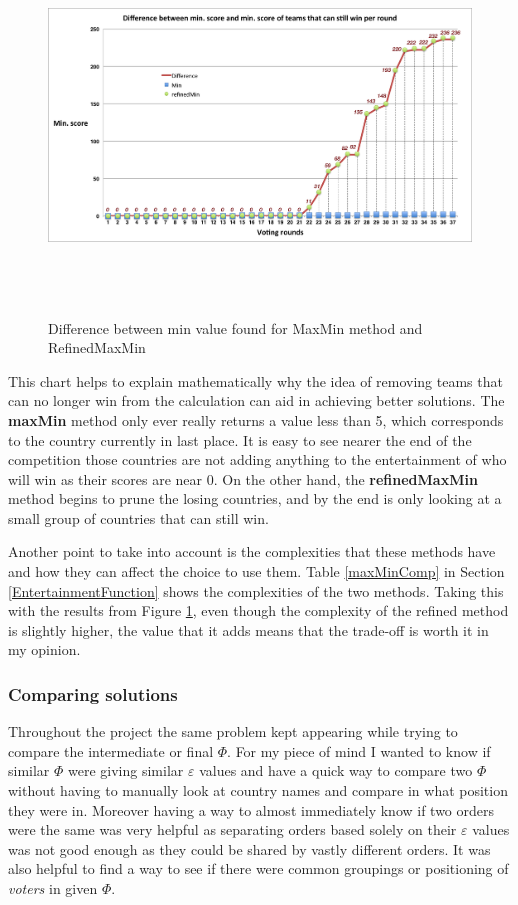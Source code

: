 \documentclass[12pt]{report}
\begin{document}
\begin{figure}[H]
\centering
\includegraphics[width=17cm, height=10cm]{../code/misc/difference_MinvsRefinedMin}
\caption{Difference between min value found for MaxMin method and RefinedMaxMin}
\label{f_maxminDif}
\end{figure}
This chart helps to explain mathematically why the idea of removing teams that can no longer win from the calculation can aid in achieving better solutions. The \textbf{maxMin} method only ever really returns a value less than 5, which corresponds to the country currently in last place. It is easy to see nearer the end of the competition those countries are not adding anything to the entertainment of who will win as their scores are near 0. On the other hand, the \textbf{refinedMaxMin} method begins to prune the losing countries, and by the end is only looking at a small group of countries that can still win.

Another point to take into account is the complexities that these methods have and how they can affect the choice to use them. Table \ref{maxMinComp} in Section \ref{EntertainmentFunction} shows the complexities of the two methods. Taking this with the results from Figure \ref{f_maxminDif}, even though the complexity of the refined method is slightly higher, the value that it adds means that the trade-off is worth it in my opinion.

\subsubsection{Comparing solutions}
Throughout the project the same problem kept appearing while trying to compare the intermediate or final $\Phi$. For my piece of mind I wanted to know if similar $\Phi$ were giving similar $\varepsilon$ values and have a quick way to compare two $\Phi$ without having to manually look at country names and compare in what position they were in. Moreover having a way to almost immediately know if two orders were the same was very helpful as separating orders based solely on their $\varepsilon$ values was not good enough as they could be shared by vastly different orders. It was also helpful to find a way to see if there were common groupings or positioning of \textit{voters} in given $\Phi$.
\end{document}
